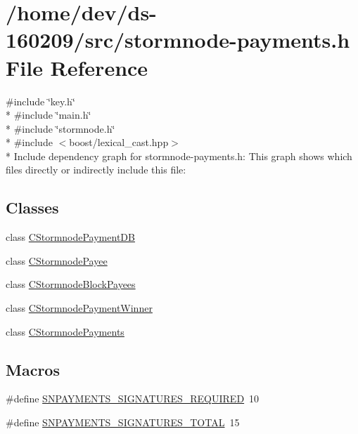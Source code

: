 \hypertarget{stormnode-payments_8h}{}\section{/home/dev/ds-\/160209/src/stormnode-\/payments.h File Reference}
\label{stormnode-payments_8h}
{\ttfamily \#include \char`\"{}key.\+h\char`\"{}}\\*
{\ttfamily \#include \char`\"{}main.\+h\char`\"{}}\\*
{\ttfamily \#include \char`\"{}stormnode.\+h\char`\"{}}\\*
{\ttfamily \#include $<$boost/lexical\+\_\+cast.\+hpp$>$}\\*
Include dependency graph for stormnode-\/payments.h\+:
This graph shows which files directly or indirectly include this file\+:
\subsection*{Classes}
\begin{DoxyCompactItemize}
\item 
class \hyperlink{class_c_stormnode_payment_d_b}{C\+Stormnode\+Payment\+D\+B}
\item 
class \hyperlink{class_c_stormnode_payee}{C\+Stormnode\+Payee}
\item 
class \hyperlink{class_c_stormnode_block_payees}{C\+Stormnode\+Block\+Payees}
\item 
class \hyperlink{class_c_stormnode_payment_winner}{C\+Stormnode\+Payment\+Winner}
\item 
class \hyperlink{class_c_stormnode_payments}{C\+Stormnode\+Payments}
\end{DoxyCompactItemize}
\subsection*{Macros}
\begin{DoxyCompactItemize}
\item 
\#define \hyperlink{stormnode-payments_8h_a562899bed0fbecb5a44802e779462049}{S\+N\+P\+A\+Y\+M\+E\+N\+T\+S\+\_\+\+S\+I\+G\+N\+A\+T\+U\+R\+E\+S\+\_\+\+R\+E\+Q\+U\+I\+R\+E\+D}~10
\item 
\#define \hyperlink{stormnode-payments_8h_af87771f9ac5a9aaa0ca06f3b164cc1ba}{S\+N\+P\+A\+Y\+M\+E\+N\+T\+S\+\_\+\+S\+I\+G\+N\+A\+T\+U\+R\+E\+S\+\_\+\+T\+O\+T\+A\+L}~15
\end{DoxyCompactItemize}
